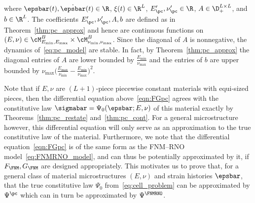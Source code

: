 \documentclass[letterpaper,11pt]{article}
\begin{document}
where $\epsbar(t), \dot{\epsbar}(t) \in \R$, $\xi(t) \in \R^L$, $E_{\pc}', \nu_{\pc}' \in \R$, $A \in \D_+^{L\times L}$, and $b \in \R^{L}$. The coefficients $E_{\pc}', \nu_{\pc}', A, b$ are defined as in Theorem~\ref{thm:pc_approx} and hence are continuous functions on $(E, \nu) \in \cM_{E_{\min}, E_{\max}}^B \times \cM_{\nu_{\min}, \nu_{\max}}^B$. Since the diagonal of $A$ is nonnegative, the dynamics of~\eqref{eq:pc_model} are stable. In fact, by Theorem~\ref{thm:pc_approx} the diagonal entries of $A$ are lower bounded by $\frac{E_{\min}}{\nu_{\max}}$ and the entries of $b$ are upper bounded by $\nu_{\max}\big(\frac{E_{\max}}{\nu_{\min}} - \frac{E_{\min}}{\nu_{\max}}\big)^2$.

Note that if $E, \nu$ are $(L+1)$-piece piecewise constant materials with equi-sized pieces, then the differential equation above~\eqref{eqn:FGpc} agrees with the constitutive law $\sigmabar = \Psi_0(\epsbar; E, \nu)$ of this material exactly by Theorems~\ref{thm:pc_restate} and~\ref{thm:pc_cont}. For a general microstructure however, this differential equation will only serve as an approximation to the true constitutive law of the material. Furthermore, we note that the differential equation~\eqref{eqn:FGpc} is of the same form as the FNM--RNO model~\eqref{eq:FNMRNO_model}, and can thus be potentially approximated by it, if $F_{\FNM}, G_{\FNM}$ are designed appropriately. This motivates us to prove that, for a general class of material microstructures $(E, \nu)$ and strain histories $\epsbar$, that the true constitutive law $\Psi_0$ from~\eqref{eq:cell_problem} can be approximated by $\Psi^{\pc}$ which can in turn be approximated by $\Psi^{\FNMRNO}$.
\end{document}
